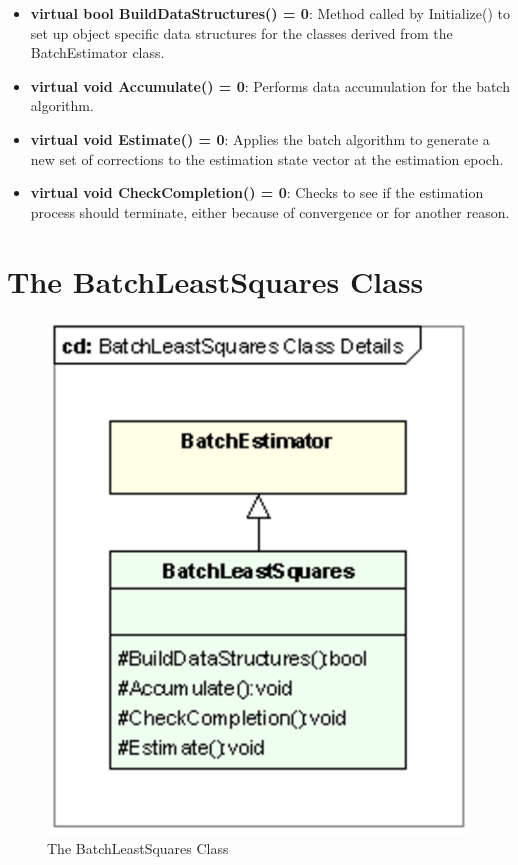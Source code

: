 \begin{itemize}
\item \textbf{virtual bool BuildDataStructures() = 0}:  Method called by Initialize() to set up object specific data structures for the classes derived from the BatchEstimator class.
\item \textbf{virtual void Accumulate() = 0}:  Performs data accumulation for the batch algorithm.
\item \textbf{virtual void Estimate() = 0}:  Applies the batch algorithm to generate a new set of corrections to the estimation state vector at the estimation epoch.
\item \textbf{virtual void CheckCompletion() = 0}:  Checks to see if the estimation process should terminate, either because of convergence or for another reason.
\end{itemize}

\section{The BatchLeastSquares Class}

\begin{figure}[htbp]
\begin{center}
\includegraphics[scale=0.6]{Images/BatchLeastSquaresClassDetails.eps}
\caption{\label{fig:BatchLeastSquaresClass}The BatchLeastSquares Class}
\end{center}
\end{figure}

